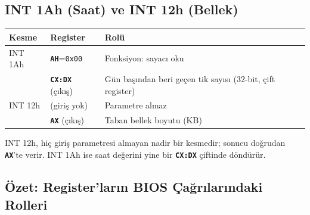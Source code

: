 \documentclass[11pt,a4paper]{article}
\newcommand{\reg}[1]{\texttt{\color{anaMavi}\textbf{#1}}}
\newcommand{\hx}[1]{\texttt{\color{turuncu}#1}}
\begin{document}
\subsection{INT 1Ah (Saat) ve INT 12h (Bellek)}

\begin{center}
\begin{tabularx}{\textwidth}{@{}l l >{\raggedright\arraybackslash}X@{}}
\toprule
\rowcolor{anaMavi}\color{white}\textbf{Kesme} & \color{white}\textbf{Register} & \color{white}\textbf{Rolü} \\
\midrule
INT 1Ah & \reg{AH}=\hx{0x00} & Fonksiyon: sayacı oku \\
\rowcolor{acikGri} & \reg{CX:DX} (çıkış) & Gün başından beri geçen tik sayısı (32-bit, çift register) \\
\midrule
INT 12h & (giriş yok) & Parametre almaz \\
\rowcolor{acikGri} & \reg{AX} (çıkış) & Taban bellek boyutu (KB) \\
\bottomrule
\end{tabularx}
\end{center}
INT 12h, hiç giriş parametresi almayan nadir bir kesmedir; sonucu doğrudan
\reg{AX}'te verir. INT 1Ah ise saat değerini yine bir \reg{CX:DX} çiftinde
döndürür.

\subsection{Özet: Register'ların BIOS Çağrılarındaki Rolleri}
\end{document}
